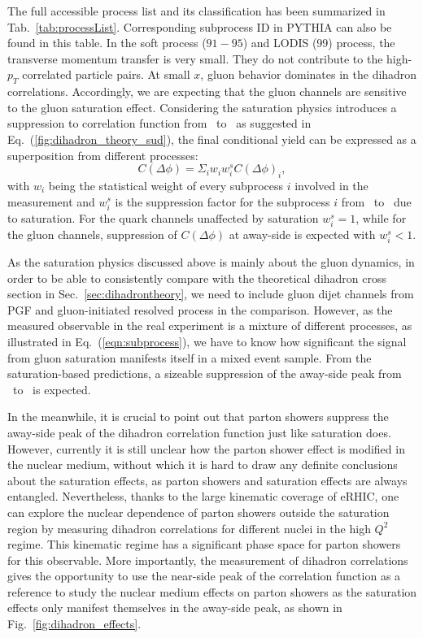 The full accessible process list and its classification has been summarized in
Tab.~\ref{tab:processList}. Corresponding subprocess ID in PYTHIA can also be found in this table. In the soft process ($91-95$) and LODIS (99)
process, the transverse momentum transfer is very small. They do not contribute
to the high-$p_{T}$ correlated particle pairs. At small $x$, gluon behavior
dominates in the dihadron correlations. Accordingly, we are expecting that the gluon channels are sensitive to the gluon saturation effect. Considering the
saturation physics introduces a suppression to correlation function from \ep\ to
\eA\ as suggested in Eq.~(\ref{fig:dihadron_theory_sud}), the final conditional
yield can be expressed as a superposition from different processes:
\begin{equation} 
C(\Delta\phi)=\Sigma_{i}w_{i}w^{s}_{i}C(\Delta\phi)_{i},
\label{eqn:subprocess} 
\end{equation}
with $w_{i}$ being the statistical weight of every subprocess $i$ involved in
the measurement and $w^{s}_{i}$ is the suppression factor for the subprocess $i$
from \ep\ to \eA\ due to saturation. For the quark channels unaffected by saturation $w^{s}_{i}=1$,
while for the gluon channels, suppression of $C(\Delta\phi)$ at away-side is
expected with $w^{s}_{i}<1$.


As the saturation physics discussed above is mainly about the gluon dynamics, in
order to be able to consistently compare with the theoretical dihadron cross
section in Sec.~\ref{sec:dihadrontheory}, we need to include gluon dijet channels from
PGF and gluon-initiated resolved process in the comparison. However, as the
measured observable in the real experiment is a mixture of different processes, as
illustrated in Eq.~(\ref{eqn:subprocess}), we have to know how significant the
signal from gluon saturation manifests itself in a mixed event sample. From the
saturation-based predictions, a sizeable suppression of the away-side peak from \ep\
to \eA\ is expected.

In the meanwhile, it is crucial to point out that parton showers suppress the
away-side peak of the dihadron correlation function just like saturation does.
However, currently it is still unclear how the parton shower effect is modified
in the nuclear medium, without which it is hard to draw any definite conclusions
about the saturation effects, as parton showers and saturation effects are always
entangled. Nevertheless, thanks to the large kinematic coverage of eRHIC, one
can explore the nuclear dependence of parton showers outside the saturation
region by measuring dihadron correlations for different nuclei in the high
$Q^2$ regime. This kinematic regime has a significant phase space for parton
showers for this observable. More importantly, the measurement of dihadron
correlations gives the opportunity to use the near-side peak of the correlation
function as a reference to study the nuclear medium effects on parton showers as
the saturation effects only manifest themselves in the away-side peak, as shown
in Fig.~\ref{fig:dihadron_effects}.

